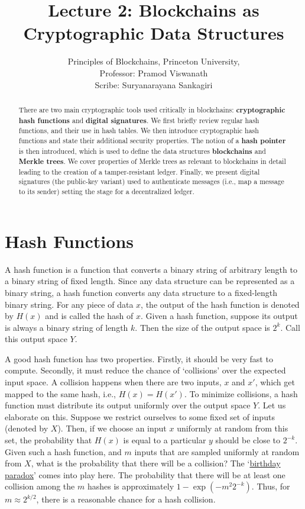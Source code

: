 \documentclass{article}
\title{Lecture 2:  Blockchains as Cryptographic Data Structures}
\author{Principles of Blockchains, Princeton University,  \\ Professor:  Pramod Viswanath \\ Scribe: Suryanarayana Sankagiri}
\begin{document}
\maketitle

\begin{abstract}
There are two main cryptographic tools used critically in blockchains: \textbf{cryptographic hash functions} and \textbf{digital signatures}. We first briefly review regular hash functions, and their use in hash tables. We then introduce cryptographic hash functions and state their additional security properties. The notion of a \textbf{hash pointer} is then introduced, which is used to define the data structures \textbf{blockchains} and \textbf{Merkle trees}. We cover properties of Merkle trees as relevant to blockchains in detail leading to the creation of a tamper-resistant ledger. Finally, we present digital signatures (the public-key variant) used to authenticate messages (i.e., map a message to its sender) setting the stage for a decentralized ledger.  
\end{abstract}

\section*{Hash Functions}
A hash function is a function that converts a binary string of arbitrary length to a binary string of fixed length. Since any data structure can be represented as a binary string, a hash function converts any data structure to a fixed-length binary string. For any piece of data $x$, the output of the hash function is denoted by $H(x)$ and is called the hash of $x$. Given a hash function, suppose its output is always a binary string of length $k$. Then the size of the output space is $2^k$. Call this output space $Y$. 

A good hash function has two properties. Firstly, it should be very fast to compute. Secondly, it must reduce the chance of ‘collisions’ over the expected input space. A collision happens when there are two inputs, $x$ and $x'$, which get mapped to the same hash, i.e., $H(x) = H(x')$. To minimize collisions, a hash function must distribute its output uniformly over the output space $Y$. Let us elaborate on this. Suppose we restrict ourselves to some fixed set of inputs (denoted by $X$). Then, if we choose an input $x$ uniformly at random from this set, the probability that $H(x)$ is equal to a particular $y$ should be close to $2^{-k}$. Given such a hash function, and $m$ inputs that are sampled uniformly at random from $X$, what is the probability that there will be a collision? The ‘\href{https://en.wikipedia.org/wiki/Birthday_problem}{birthday paradox}’ comes into play here. The probability that there will be at least one collision among the $m$ hashes is approximately $1 - \exp(-m^2 2^{-k})$. Thus, for $ m \approx 2^{k/2} $, there is a reasonable chance for a hash collision.
\end{document}
